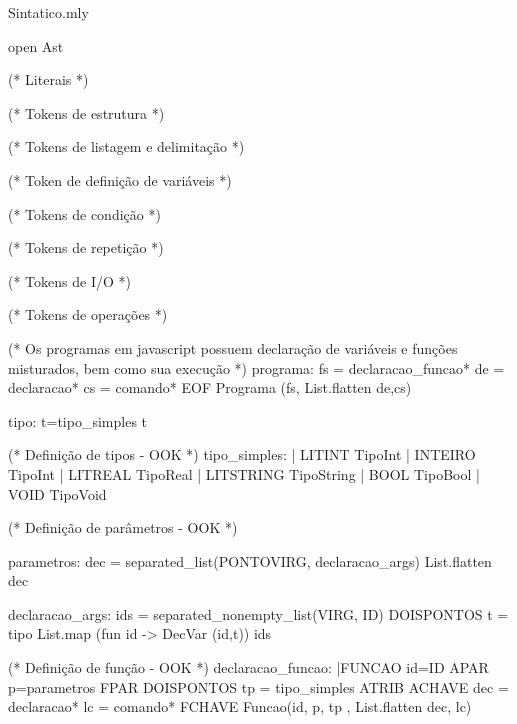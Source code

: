 \documentclass[12pt,a4paper,twoside]{article}
\begin{document}
Sintatico.mly
\begin{terminal}
	open Ast

(* Literais *)


(* Tokens de estrutura *)


(* Tokens de listagem e delimitação *)

(* Token de definição de variáveis *)

(* Tokens de condição *)

(* Tokens de repetição *)

(* Tokens de I/O *)

(* Tokens de operações *)




(* Os programas em javascript possuem declaração de variáveis e funções misturados, bem como sua execução *)
programa:	fs = declaracao_funcao*
			de = declaracao*
			cs = comando*
			EOF { Programa (fs, List.flatten de,cs) }	

tipo: t=tipo_simples { t }

(* Definição de tipos      					- OOK *)
tipo_simples: 	| LITINT 		{ TipoInt		}
				| INTEIRO 		{ TipoInt		}
				| LITREAL		{ TipoReal 		}
				| LITSTRING 	{ TipoString 	}
				| BOOL 			{ TipoBool 		}
				| VOID			{ TipoVoid 		}

(* Definição de parâmetros 					- OOK *)

parametros: dec = separated_list(PONTOVIRG, declaracao_args) { List.flatten dec}

declaracao_args: ids = separated_nonempty_list(VIRG, ID) DOISPONTOS t = tipo {List.map (fun id -> DecVar (id,t)) ids}

(* Definição de função 						- OOK *)
declaracao_funcao: 
		|FUNCAO id=ID APAR p=parametros FPAR DOISPONTOS tp = tipo_simples ATRIB 
			ACHAVE
				dec = declaracao*
				lc = comando*
			FCHAVE {Funcao(id, p, tp , List.flatten dec, lc) }



\end{terminal}
\end{document}
